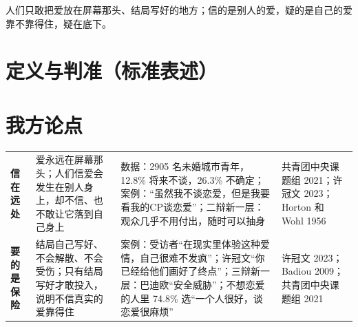 \documentclass[quick,con]{debate}
\begin{document}
\debatetitle
\begin{thesisbox}人们只敢把爱放在屏幕那头、结局写好的地方；信的是别人的爱，疑的是自己的爱靠不靠得住，疑在底下。\end{thesisbox}

\section{定义与判准（标准表述）}
\begin{fields}
\end{fields}

\section{我方论点}
\begin{tabularx}{\linewidth}{@{}L{4.6em}Y Y L{6.4em}@{}}\toprule
{}&&&\\\midrule
\textbf{信在远处}&爱永远在屏幕那头；人们信爱会发生在别人身上，却不信、也不敢让它落到自己身上&数据：2905 名未婚城市青年，12.8\% 将来不谈，26.3\% 不确定；案例：“虽然我不谈恋爱，但是我要看我的CP谈恋爱”；二辩新一层：观众几乎不用付出，随时可以抽身&共青团中央课题组 2021；许冠文 2023；Horton 和 Wohl 1956\\
\textbf{要的是保险}&结局自己写好、不会解散、不会受伤；只有结局写好才敢投入，说明不信真实的爱靠得住&案例：受访者“在现实里体验这种爱情，自己很难不发疯”；许冠文“你已经给他们画好了终点”；三辩新一层：巴迪欧“安全威胁”；不想恋爱的人里 74.8\% 选“一个人很好，谈恋爱很麻烦”&许冠文 2023；Badiou 2009；共青团中央课题组 2021\\
\bottomrule\end{tabularx}
\end{document}
